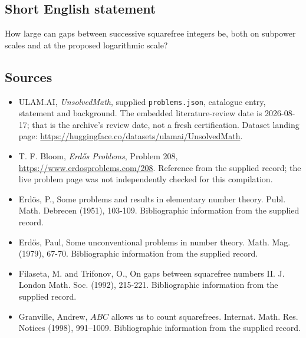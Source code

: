 \documentclass[11pt,a4paper]{article}
\begin{document}
\subsection{Short English statement}

How large can gaps between successive squarefree integers be, both on subpower scales and at the proposed logarithmic scale?

\subsection{Sources}

{\small

\begin{itemize}

\item[\hypertarget{source:statement:1}{S1}] ULAM.AI, \emph{UnsolvedMath}, supplied \texttt{problems.json}, catalogue entry, statement and background. The embedded literature-review date is 2026-08-17; that is the archive’s review date, not a fresh certification. Dataset landing page: \url{https://huggingface.co/datasets/ulamai/UnsolvedMath}.

\item[\hypertarget{source:statement:2}{S2}] T. F. Bloom, \emph{Erdős Problems}, Problem 208, \url{https://www.erdosproblems.com/208}. Reference from the supplied record; the live problem page was not independently checked for this compilation.

\item[\hypertarget{source:statement:3}{S3}] Erd\"{o}s, P., Some problems and results in elementary number theory. Publ. Math. Debrecen (1951), 103-109. Bibliographic information from the supplied record.

\item[\hypertarget{source:statement:4}{S4}] Erd\H{o}s, Paul, Some unconventional problems in number theory. Math. Mag. (1979), 67-70. Bibliographic information from the supplied record.

\item[\hypertarget{source:statement:5}{S5}] Filaseta, M. and Trifonov, O., On gaps between squarefree numbers II. J. London Math. Soc. (1992), 215-221. Bibliographic information from the supplied record.

\item[\hypertarget{source:statement:6}{S6}] Granville, Andrew, {$ABC$} allows us to count squarefrees. Internat. Math. Res. Notices (1998), 991--1009. Bibliographic information from the supplied record.

\end{itemize}

}

\label{end:statement}
\end{document}
